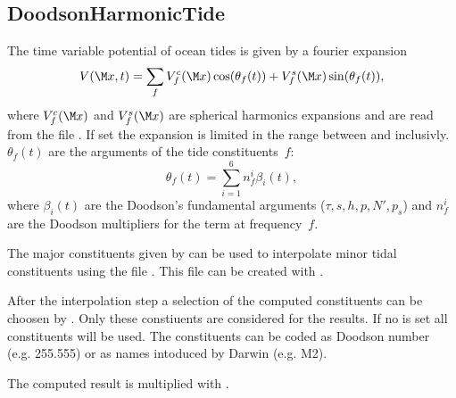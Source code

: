 \subsection{DoodsonHarmonicTide}\label{tidesType:doodsonHarmonicTide}
The time variable potential of ocean tides is given by a fourier expansion
\begin{equation}
V(\M x,t) = \sum_{f} V_f^c(\M x)\cos(\theta_f(t)) + V_f^s(\M x)\sin(\theta_f(t)),
\end{equation}
where $V_f^c(\M x)$ and $V_f^s(\M x)$ are spherical harmonics expansions and are
read from the file .
If set the expansion is limited in the range between 
and  inclusivly.
$\theta_f(t)$ are the arguments of the tide constituents~$f$:
\begin{equation}
\theta_f(t) = \sum_{i=1}^6 n_f^i\beta_i(t),
\end{equation}
where $\beta_i(t)$ are the Doodson's fundamental arguments ($\tau,s,h,p,N',p_s$)
and $n_f^i$ are the Doodson multipliers for the term at frequency~$f$.

The major constituents given by  can be used to
interpolate minor tidal constituents using the file .
This file can be created with .

After the interpolation step a selection of the computed constituents can be
choosen by . Only these constiuents are considered for the results.
If no  is set all constituents will be used. The constituents can
be coded as Doodson number (e.g. 255.555) or as names intoduced by Darwin (e.g. M2).

The computed result is multiplied with .



